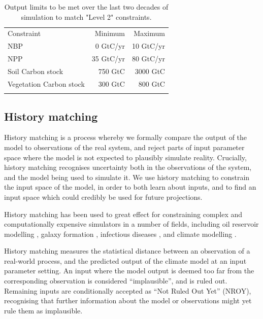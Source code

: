 \documentclass[gmd, manuscript]{copernicus}
\begin{document}
\begin{table}[t]
\caption{Output limits to be met over the last two decades of simulation to match "Level 2" constraints.}
\label{table:level_2_constraints}
\begin{tabular}{l r r}
\tophline
Constraint & Minimum & Maximum \\ 
\middlehline
NBP & 0 GtC/yr &  10 GtC/yr\\
NPP & 35 GtC/yr & 80 GtC/yr \\
Soil Carbon stock & 750 GtC &  3000 GtC\\ 
Vegetation Carbon stock & 300 GtC & 800 GtC \\

\bottomhline
\end{tabular}
\belowtable{} %

\end{table}


\subsection{History matching}\label{ssec:history_matching}

History matching is a process whereby we formally compare the output of the model to observations of the real system, and reject parts of input parameter space where the model is not expected to plausibly simulate reality. Crucially, history matching recognises uncertainty both in the observations of the system, and the model being used to simulate it. We use history matching to constrain the input space of the model, in order to both learn about inputs, and to find an input space which could credibly be used for future projections.

History matching has been used to great effect for constraining complex and computationally expensive simulators in a number of fields, including oil reservoir modelling \citep{craig1996strategies, craig1997pressure}, galaxy formation \citep{vernon2010galaxy, vernon2014observable}, infectious diseases \citep{andrianakis2015bayesian}, and climate modelling \citep{williamson2013history, williamson2015identifying, mcneall2020correcting}.

History matching measures the statistical distance between an observation of a real-world process, and the predicted output of the climate model at an input parameter setting. An input where the model output is deemed too far from the corresponding observation is considered ``implausible'', and is ruled out. Remaining inputs are conditionally accepted as ``Not Ruled Out Yet'' (NROY), recognising that further information about the model or observations might yet rule them as implausible.
\end{document}
